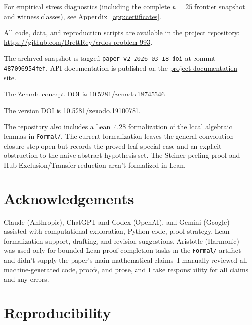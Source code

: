 \documentclass[12pt,oneside]{article}
\theoremstyle{remark}
\begin{document}
For empirical stress diagnostics (including the complete $n=25$ frontier snapshot and witness classes), see Appendix~\ref{app:certificates}.

All code, data, and reproduction scripts are available in the project repository:
\url{https://github.com/BrettRey/erdos-problem-993}.

The archived snapshot is tagged \texttt{paper-v2-2026-03-18-doi}
at commit \texttt{487096954fef}.
API documentation is published on the
\href{https://brettrey.github.io/erdos-problem-993/docs/}{project documentation site}.

The Zenodo concept DOI is
\href{https://doi.org/10.5281/zenodo.18745546}{10.5281/\allowbreak zenodo.18745546}.

The version DOI is
\href{https://doi.org/10.5281/zenodo.19100781}{10.5281/\allowbreak zenodo.19100781}.

The repository also includes a Lean~4.28 formalization of the local algebraic lemmas in \texttt{Formal/}. The current formalization leaves the general convolution-closure step open but records the proved leaf special case and an explicit obstruction to the naive abstract hypothesis set. The Steiner-peeling proof and Hub Exclusion/Transfer reduction aren't formalized in Lean.


\section*{Acknowledgements}

Claude (Anthropic), ChatGPT and Codex (OpenAI), and Gemini (Google) assisted with computational exploration, Python code, proof strategy, Lean formalization support, drafting, and revision suggestions.
Aristotle (Harmonic) was used only for bounded Lean proof-completion tasks in the \texttt{Formal/} artifact and didn't supply the paper's main mathematical claims.
I manually reviewed all machine-generated code, proofs, and prose, and I take responsibility for all claims and any errors.

\appendix

\section{Reproducibility}\label{app:repro}
\end{document}
